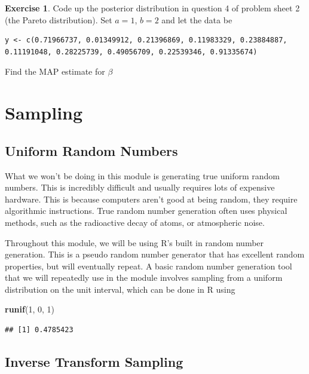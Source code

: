 \documentclass[
]{book}
\newenvironment{Shaded}{\begin{snugshade}}{\end{snugshade}}
\newcommand{\DecValTok}[1]{\textcolor[rgb]{0.00,0.00,0.81}{#1}}
\newcommand{\FunctionTok}[1]{\textcolor[rgb]{0.13,0.29,0.53}{\textbf{#1}}}
\newcommand{\NormalTok}[1]{#1}
\theoremstyle{definition}
\theoremstyle{definition}
\theoremstyle{definition}
\newtheorem{exercise}{Exercise}[chapter]
\theoremstyle{definition}
\theoremstyle{remark}
\begin{document}
\begin{exercise}
Code up the posterior distribution in question 4 of problem sheet 2 (the Pareto distribution). Set \(a = 1\), \(b = 2\) and let the data be

\begin{verbatim}
y <- c(0.71966737, 0.01349912, 0.21396869, 0.11983329, 0.23884887, 0.11191048, 0.28225739, 0.49056709, 0.22539346, 0.91335674)
\end{verbatim}

Find the MAP estimate for \(\beta\)
\end{exercise}

\hypertarget{sampling}{%
\chapter{Sampling}\label{sampling}}

\hypertarget{uniform-random-numbers}{%
\section{Uniform Random Numbers}\label{uniform-random-numbers}}

What we won't be doing in this module is generating true uniform random numbers. This is incredibly difficult and usually requires lots of expensive hardware. This is because computers aren't good at being random, they require algorithmic instructions. True random number generation often uses physical methods, such as the radioactive decay of atoms, or atmospheric noise.

Throughout this module, we will be using R's built in random number generation. This is a pseudo random number generator that has excellent random properties, but will eventually repeat. A basic random number generation tool that we will repeatedly use in the module involves sampling from a uniform distribution on the unit interval, which can be done in R using

\begin{Shaded}
\begin{Highlighting}[]
\FunctionTok{runif}\NormalTok{(}\DecValTok{1}\NormalTok{, }\DecValTok{0}\NormalTok{, }\DecValTok{1}\NormalTok{)}
\end{Highlighting}
\end{Shaded}

\begin{verbatim}
## [1] 0.4785423
\end{verbatim}

\hypertarget{inverse-transform-sampling}{%
\section{Inverse Transform Sampling}\label{inverse-transform-sampling}}
\end{document}
